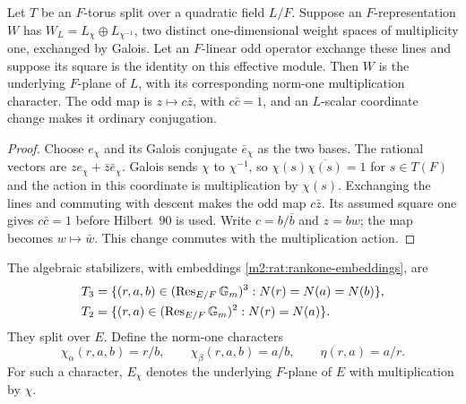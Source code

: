 \begin{lemma}
\label{m2:nor:root-pair-descent}
Let $T$ be an $F$-torus split over a quadratic field $L/F$. Suppose an
$F$-representation $W$ has
$W_L=L_\chi\oplus L_{\chi^{-1}}$, two distinct one-dimensional
weight spaces of multiplicity one, exchanged by Galois. Let an
$F$-linear odd operator exchange these lines and suppose its square
is the identity on this effective module. Then $W$ is the underlying
$F$-plane of $L$, with its corresponding norm-one multiplication
character. The odd map is $z\mapsto c\bar z$, with $c\bar c=1$,
and an $L$-scalar coordinate change makes it ordinary conjugation.
\end{lemma}
\begin{proof}
Choose $e_\chi$ and its Galois conjugate $\bar e_\chi$ as the two
bases. The rational vectors are
$ze_\chi+\bar z\bar e_\chi$. Galois sends $\chi$ to $\chi^{-1}$,
so $\chi(s)\overline{\chi(s)}=1$ for $s\in T(F)$ and the action
in this coordinate is multiplication by $\chi(s)$. Exchanging the
lines and commuting with descent makes the odd map $c\bar z$.
Its assumed square one gives $c\bar c=1$ before Hilbert~90 is
used. Write $c=b/\bar b$ and $z=bw$; the map becomes $w\mapsto\bar w$.
This change commutes with the multiplication action.
\end{proof}
The algebraic stabilizers, with embeddings
\eqref{m2:rat:rankone-embeddings}, are
\begin{equation}\label{m2:nor:rational-rankone-tori}
 \begin{split}
 T_3&=\{(r,a,b)\in(\operatorname{Res}_{E/F}\mathbb G_m)^3:N(r)=N(a)=N(b)\},\\
 T_2&=\{(r,a)\in(\operatorname{Res}_{E/F}\mathbb G_m)^2:N(r)=N(a)\}.
 \end{split}
\end{equation}
They split over $E$. Define the norm-one characters
\begin{equation}\label{m2:nor:rational-characters}
 \chi_\alpha(r,a,b)=r/b,\qquad
 \chi_\beta(r,a,b)=a/b,\qquad\eta(r,a)=a/r.
\end{equation}
For such a character, $E_\chi$ denotes the underlying $F$-plane
of $E$ with multiplication by $\chi$.

